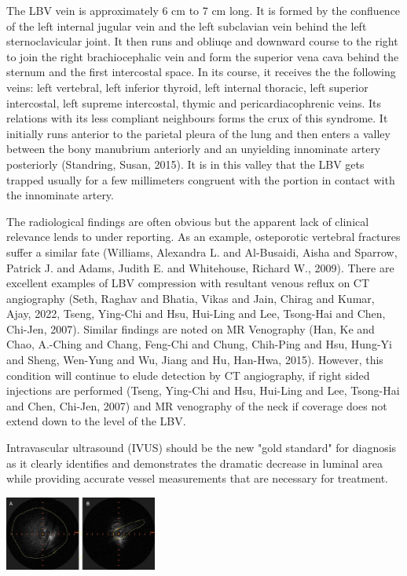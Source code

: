 \documentclass{article}
\begin{document}
The LBV vein is approximately 6 cm to 7 cm long.
It is formed by the confluence of the left internal jugular vein and the left subclavian vein behind the left sternoclavicular joint.
It then runs and obliuqe and downward course to the right to join the right brachiocephalic vein and form the superior vena cava behind the sternum and the first intercostal space.
In its course, it receives the the following veins: left  vertebral, left inferior thyroid, left internal thoracic, left superior intercostal, left supreme intercostal, thymic and pericardiacophrenic veins.
Its relations with its less compliant neighbours forms the crux of this syndrome.
It initially runs anterior to the parietal pleura of the lung and then enters a valley between the bony manubrium anteriorly and an unyielding innominate artery posteriorly (Standring, Susan, 2015).
It is in this valley that the LBV gets trapped usually for a few millimeters congruent with the portion in contact with the innominate artery.

The radiological findings are often obvious but the apparent lack of clinical relevance lends to under reporting.
As an example, osteporotic vertebral fractures suffer a similar fate (Williams, Alexandra L. and Al-Busaidi, Aisha and Sparrow, Patrick J. and Adams, Judith E. and Whitehouse, Richard W., 2009).
There are excellent examples of LBV compression with resultant venous reflux on CT angiography (Seth, Raghav and Bhatia, Vikas and Jain, Chirag and Kumar, Ajay, 2022,  Tseng, Ying-Chi and Hsu, Hui-Ling and Lee, Tsong-Hai and Chen, Chi-Jen, 2007).
Similar findings are noted on MR Venography (Han, Ke and Chao, A.-Ching and Chang, Feng-Chi and Chung, Chih-Ping and Hsu, Hung-Yi and Sheng, Wen-Yung and Wu, Jiang and Hu, Han-Hwa, 2015).
However, this condition will continue to elude detection by CT angiography, if right sided injections are performed (Tseng, Ying-Chi and Hsu, Hui-Ling and Lee, Tsong-Hai and Chen, Chi-Jen, 2007) and MR venography of the neck if coverage does not extend down to the level of the LBV.

Intravascular ultrasound (IVUS) should be the new "gold standard" for diagnosis as it clearly identifies and demonstrates the dramatic decrease in luminal area while providing accurate vessel measurements that are necessary for treatment.

\begin{center}
\includegraphics[angle=90,width=5cm]{images/LBVivus.jpg}
\end{center}
\end{document}
